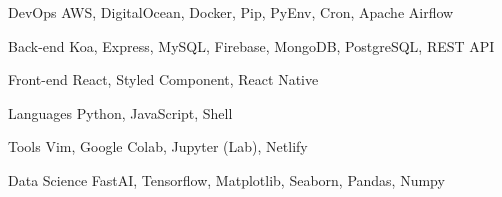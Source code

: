

\begin{cvskills}

  \cvskill
    {DevOps} %
    {AWS, DigitalOcean, Docker, Pip, PyEnv, Cron, Apache Airflow} %

  \cvskill
    {Back-end} %
    {Koa, Express, MySQL, Firebase, MongoDB, PostgreSQL, REST API} %

  \cvskill
    {Front-end} %
    {React, Styled Component, React Native} %

  \cvskill
    {Languages} %
    {Python, JavaScript, Shell} %

  \cvskill
    {Tools} %
    {Vim, Google Colab, Jupyter (Lab), Netlify} %

  \cvskill
    {Data Science} %
    {FastAI, Tensorflow, Matplotlib, Seaborn, Pandas, Numpy } %

\end{cvskills}
